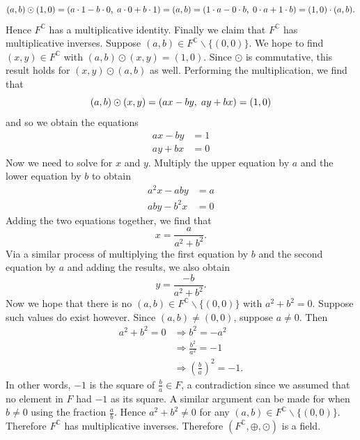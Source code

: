 \documentclass[12pt]{article}
\newcommand{\C}{\mathbb{C}}
\newcommand{\ttc}{, \hspace{1mm}}
\theoremstyle{plain}
\theoremstyle{definition}
\begin{document}
	\[
		(a,b)\odot(1,0) = (a\cdot 1 - b\cdot 0\ttc a\cdot 0 + b\cdot 1) = (a,b) = (1\cdot a - 0\cdot b\ttc 0\cdot a + 1\cdot b) = (1,0)\cdot (a,b).
	\]
	Hence $F^\C$ has a multiplicative identity. Finally we claim that $F^\C$ has multiplicative inverses. Suppose $(a,b)\in F^\C\backslash\{(0,0)\}$. We hope to find $(x,y)\in F^\C$ with $(a,b)\odot(x,y) = (1,0)$. Since $\odot$ is commutative, this result holds for $(x,y)\odot(a,b)$ as well. Performing the multiplication, we find that
	\[
		(a,b)\odot(x,y) = (ax - by\ttc ay + bx) = (1,0)
	\]
	and so we obtain the equations
	\begin{align*}
		ax - by & = 1\\
		ay + bx & = 0
	\end{align*}
	Now we need to solve for $x$ and $y$. Multiply the upper equation by $a$ and the lower equation by $b$ to obtain
	\begin{align*}
		a^2x - aby & = a\\
		aby - b^2x & = 0
	\end{align*}
	Adding the two equations together, we find that
	\[
		x = \frac{a}{a^2 + b^2}.
	\]
	Via a similar process of multiplying the first equation by $b$ and the second equation by $a$ and adding the results, we also obtain
	\[
		y = \frac{-b}{a^2 + b^2}.
	\]
	Now we hope that there is no $(a,b)\in F^\C\backslash\{(0,0)\}$ with $a^2 + b^2 = 0$. Suppose such values do exist however. Since $(a,b)\neq (0,0)$, suppose $a\neq 0$. Then
	\begin{align*}
		a^2 + b^2 = 0 & \Rightarrow b^2 = -a^2\\
		& \Rightarrow \frac{b^2}{a^2} = -1\\
		& \Rightarrow \left(\frac{b}{a}\right)^2 = -1.
	\end{align*}
 	In other words, $-1$ is the square of $\frac{b}{a}\in F$, a contradiction since we assumed that no element in $F$ had $-1$ as its square. A similar argument can be made for when $b \neq 0$ using the fraction $\frac{a}{b}$. Hence $a^2 + b^2 \neq 0$ for any $(a,b)\in F^\C\backslash\{(0,0)\}$. Therefore $F^\C$ has multiplicative inverses. Therefore $(F^\C,\oplus,\odot)$ is a field. 

\newpage
{}
\end{document}
